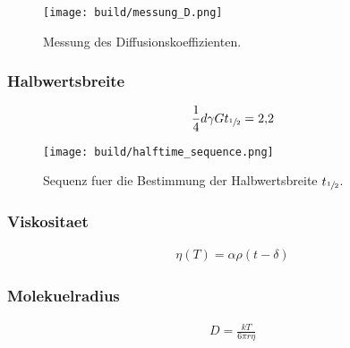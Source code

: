 \begin{figure}[ht]
  \centering
  \texttt{[image: build/messung\_D.png]}
  \caption{Messung des Diffusionskoeffizienten.}%
  \label{fig:messung_D}
\end{figure}

\subsubsection{Halbwertsbreite}%
\label{sub:halbwertsbreite}

\begin{align}
  \label{eq:halbwertszeit}
  \frac{1}{4} d \gamma G t_{\sfrac{1}{2}} = \num{2.2}
\end{align}

\begin{figure}[ht]
  \centering
  \texttt{[image: build/halftime\_sequence.png]}
  \caption{Sequenz fuer die Bestimmung der Halbwertsbreite $t_{\sfrac{1}{2}}$.}%
  \label{fig:build/halftime_sequence}
\end{figure}

\subsubsection{Viskositaet}%
\label{sub:viskositaet}

\begin{align}
  \label{eq:viskositaet}
  \eta \left(T\right) = \alpha \rho \left(t - \delta\right)
\end{align}

\subsubsection{Molekuelradius}%
\label{sub:molekuelradius}

\begin{align}
  \label{eq:molekuelradius}
  D = \frac{k T}{6 \pi r \eta}
\end{align}




